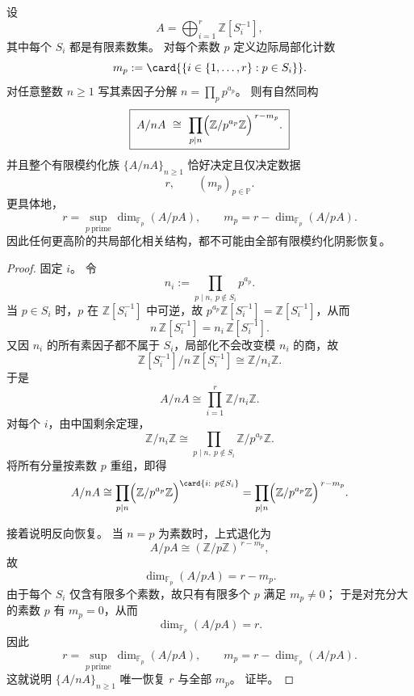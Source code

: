 \begin{theorem}[有限模约化阴影的完全边际分类]\label{thm:xi-crt-invisibility-marginal-prime-spectrum}
设
\[
A=\bigoplus_{i=1}^{r}\mathbb Z[S_i^{-1}],
\]
其中每个 \(S_i\) 都是有限素数集。
对每个素数 \(p\) 定义边际局部化计数
\[
m_p:=\card{\{i\in\{1,\dots,r\}:p\in S_i\}}.
\]
对任意整数 \(n\ge 1\) 写其素因子分解 \(n=\prod_{p}p^{a_p}\)。
则有自然同构
\[
\boxed{\;
A/nA\ \cong\ \prod_{p\mid n}\Bigl(\mathbb Z/p^{a_p}\mathbb Z\Bigr)^{\,r-m_p}.\;}
\]
并且整个有限模约化族 \(\{A/nA\}_{n\ge 1}\) 恰好决定且仅决定数据
\[
r,\qquad (m_p)_{p\in\mathbb P}.
\]
更具体地，
\[
\boxed{\;
r=\sup_{p\ \mathrm{prime}}\dim_{\mathbb F_p}(A/pA),
\qquad
m_p=r-\dim_{\mathbb F_p}(A/pA).\;}
\]
因此任何更高阶的共局部化相关结构，都不可能由全部有限模约化阴影恢复。
\end{theorem}
\begin{proof}
固定 \(i\)。
令
\[
n_i:=\prod_{p\mid n,\ p\notin S_i}p^{a_p}.
\]
当 \(p\in S_i\) 时，\(p\) 在 \(\mathbb Z[S_i^{-1}]\) 中可逆，故 \(p^{a_p}\mathbb Z[S_i^{-1}]=\mathbb Z[S_i^{-1}]\)，从而
\[
n\,\mathbb Z[S_i^{-1}]=n_i\,\mathbb Z[S_i^{-1}].
\]
又因 \(n_i\) 的所有素因子都不属于 \(S_i\)，局部化不会改变模 \(n_i\) 的商，故
\[
\mathbb Z[S_i^{-1}]/n\,\mathbb Z[S_i^{-1}]
\cong
\mathbb Z/n_i\mathbb Z.
\]
于是
\[
A/nA
\cong
\prod_{i=1}^{r}\mathbb Z/n_i\mathbb Z.
\]
对每个 \(i\)，由中国剩余定理，
\[
\mathbb Z/n_i\mathbb Z
\cong
\prod_{p\mid n,\ p\notin S_i}\mathbb Z/p^{a_p}\mathbb Z.
\]
将所有分量按素数 \(p\) 重组，即得
\[
A/nA
\cong
\prod_{p\mid n}\Bigl(\mathbb Z/p^{a_p}\mathbb Z\Bigr)^{\card\{i:\ p\notin S_i\}}
=
\prod_{p\mid n}\Bigl(\mathbb Z/p^{a_p}\mathbb Z\Bigr)^{\,r-m_p}.
\]

接着说明反向恢复。
当 \(n=p\) 为素数时，上式退化为
\[
A/pA\cong (\mathbb Z/p\mathbb Z)^{\,r-m_p},
\]
故
\[
\dim_{\mathbb F_p}(A/pA)=r-m_p.
\]
由于每个 \(S_i\) 仅含有限多个素数，故只有有限多个 \(p\) 满足 \(m_p\neq 0\)；
于是对充分大的素数 \(p\) 有 \(m_p=0\)，从而
\[
\dim_{\mathbb F_p}(A/pA)=r.
\]
因此
\[
r=\sup_{p\ \mathrm{prime}}\dim_{\mathbb F_p}(A/pA),
\qquad
m_p=r-\dim_{\mathbb F_p}(A/pA).
\]
这就说明 \(\{A/nA\}_{n\ge 1}\) 唯一恢复 \(r\) 与全部 \(m_p\)。
证毕。
\end{proof}

